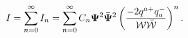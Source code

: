 \begin{equation}\label{complem_1}
I=\sum_{n=0}^{\infty}I_{n}=\sum_{n=0}^{\infty}C_{n}{\bf
\Psi}^{2}{\bf \bar\Psi}^{2}\left({-2q^{a +}q^{-}_{a}\over {\cal
W}\bar{\cal W}}\right)^{n}.
\end{equation}


